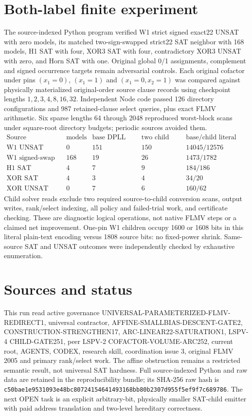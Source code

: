 \documentclass[10pt]{article}
\begin{document}
\section*{Both-label finite experiment}
The source-indexed Python program verified W1 strict signed exact22 UNSAT with zero models, its matched two-sign-swapped strict22 SAT neighbor with 168 models, H1 SAT with four, XOR3 SAT with four, contradictory XOR3 UNSAT with zero, and Horn SAT with one. Original global 0/1 assignments, complement and signed occurrence targets remain adversarial controls. Each original cofactor under pins $(x_1=0)$, $(x_1=1)$ and $(x_1=0,x_2=1)$ was compared against physically materialized original-order source clause records using checkpoint lengths $1,2,3,4,8,16,32$. Independent Node code passed 126 directory configurations and 987 retained-clause select queries, plus exact FLMV arithmetic. Six sparse lengths 64 through 2048 reproduced worst-block scans under square-root directory budgets; periodic sources avoided them.
\[
\begin{array}{lrrrr}
\text{Source}&\text{models}&\text{base DPLL nodes}&\text{two child nodes}&\text{base/child literal reads}\\
\hline
\text{W1 UNSAT}&0&151&150&14045/12576\\
\text{W1 signed-swap SAT}&168&19&26&1473/1782\\
\text{H1 SAT}&4&7&9&184/186\\
\text{XOR SAT}&4&3&4&34/20\\
\text{XOR UNSAT}&0&7&6&160/62
\end{array}
\]
Child solver reads exclude two required source-to-child conversion scans, output writes, rank/select indexing, all policy and failed-trial work, and certificate checking. These are diagnostic logical operations, not native FLMV steps or a claimed net improvement. One-pin W1 children occupy 1600 or 1608 bits in this literal plain-text encoding versus 1808 source bits: no fixed-power shrink. Same-source SAT and UNSAT outcomes were independently checked by exhaustive enumeration.

\section*{Sources and status}
This run read active governance UNIVERSAL-PARAMETERIZED-FLMV-REDIRECT1, universal contractor, AFFINE-SMALLBIAS-DESCENT-GATE2, CONSTRUCTION-STRENGTHEN17, ARC-LINEAR22-SATURATION1, LSPV-4 CHILD-GATE251, peer LSPV-2 COFACTOR-VOLUME-ARC252, current root, AGENTS, CODEX, research skill, coordination issue 3, original FLMV 2005 and primary rank/select work. The affine obstruction remains a restricted semantic result, not universal SAT hardness. Full source-indexed Python and raw data are retained in the reproducibility bundle; its SHA-256 raw hash is \texttt{c50bae1e9531093e48bc80724154641493168bb80b2307d955f5ef9f7c689786}. The next OPEN task is an explicit arbitrary-bit, physically smaller SAT-child emitter with paid address translation and two-level hereditary correctness.
\end{document}
